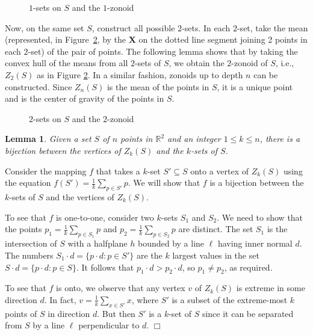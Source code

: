 \documentclass{elsart}
\newtheorem{lemma}{Lemma}
\newenvironment{proof}{{\bf Proof:} \rm}{\hfill $\Box$ \medskip\\}
\begin{document}
\begin{figure}
 \begin{center}
   \caption{\label{fig_1_set}$1$-sets on $S$ and the $1$-zonoid}
 \end{center}
\end{figure}

Now, on the same set $S$, construct all possible $2$-sets. In each
$2$-set, take the mean (represented, in Figure~\ref{fig_2_set}, by the
\textbf{X} on the dotted line segment joining 2 points in each
$2$-set) of the pair of points.  The following lemma shows that by
taking the convex hull of the means from all $2$-sets of $S$, we
obtain the $2$-zonoid of $S$, i.e., $Z_2(S)$ as in Figure
\ref{fig_2_set}.  In a similar fashion, zonoids up to depth $n$ can be
constructed.  Since $Z_n(S)$ is the mean of the points in $S$, it is a
unique point and is the center of gravity of the points in $S$.

\begin{figure}
 \begin{center}
   \caption{\label{fig_2_set}$2$-sets on $S$ and the $2$-zonoid}
 \end{center}
\end{figure}

\begin{lemma}\label{lemma_bijection}
Given a set $S$ of $n$ points in $\mathbb{R}^2$ and an integer $1 \le
k \le n$, there is a bijection between the vertices of $Z_k(S)$ and
the $k$-sets of $S$.
\end{lemma}

\begin{proof}
Consider the mapping $f$ that takes a $k$-set $S'\subseteq S$ onto a
vertex of $Z_k(S)$ using the equation $f(S')=\frac{1}{k}\sum_{p\in S'}
p$.  We will show that $f$ is a bijection between the $k$-sets of $S$ and
the vertices of $Z_k(S)$.

To see that $f$ is one-to-one, consider two $k$-sets $S_1$ and $S_2$.
We need to show that the points $p_1=\frac{1}{k}\sum_{p\in S_1}p$ and
$p_2=\frac{1}{k}\sum_{p\in S_2}p$ are distinct.  The set $S_1$ is the
intersection of $S$ with a halfplane $h$ bounded by a line $\ell$
having inner normal $d$.  The numbers $S_1\cdot d=\{p\cdot d:p\in
S'\}$ are the $k$ largest values in the set $S\cdot d=\{p\cdot
d:p\in S\}$.  It follows
that $p_1\cdot d
> p_2\cdot d$, so $p_1\neq p_2$, as required.

To see that $f$ is onto, we observe that any vertex $v$ of $Z_k(S)$ is
extreme in some direction $d$.  In fact, $v=\frac{1}{k}\sum_{x\in S'}
x$, where $S'$ is a subset of the extreme-most $k$ points of $S$ in
direction $d$.  But then $S'$ is a $k$-set of $S$ since it can be
separated from $S$ by a line $\ell$ perpendicular to $d$.
\end{proof}
\end{document}
